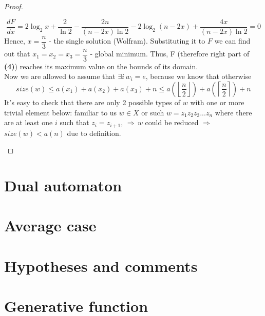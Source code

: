 \documentclass{article}
\begin{document}
\begin{proof}
\begin{enumerate}
		$$\frac{d F}{d x} = 2\log_2 x + \frac{2}{\ln 2} - \frac{2n}{(n-2x)\ln2} - 2\log_2 (n - 2x) + \frac{4x}{(n-2x)\ln 2} = 0$$
		Hence, $x = \dfrac{n}{3}$ - the single solution (Wolfram).
		Substituting it to $F$ we can find out that $x_1 = x_2 = x_3 = \dfrac{n}{3}$ - global minimum. Thus, F (therefore right part of \textbf{(4)}) reaches its maximum value on the bounds of its domain. 
		\\
		Now we are allowed to assume that $\exists i \, w_i = e$, because we know that otherwise
		$$size(w) \le a(x_1) + a(x_2) + a(x_3) + n \le a\left(
			\left\lfloor
				\frac{n}{2}
			\right\rfloor 
		\right) + a \left(
			\left\lceil
			\frac{n}{2}
			\right\rceil
		\right) + n$$
		It's easy to check that there are only 2 possible types of $w$ with one or more trivial element below: familiar to us $w \in X$ or such $w = z_1 z_2 z_3 ... z_n$ where there are at least one $i$ such that $z_i = z_{i+1}, \, \Rightarrow \, w$ could be reduced $\Rightarrow$ $size(w) < a(n)$ due to definition.
 	\end{enumerate}

\end{proof}



\section{Dual automaton}



\section{Average case}


\section{Hypotheses and comments}



\section{Generative function}
\end{document}
